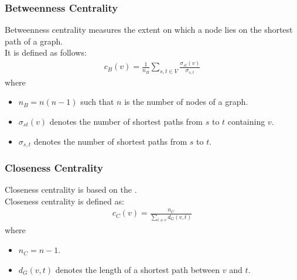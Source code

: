 \documentclass{beamer}
\begin{document}
\begin{frame}
     \frametitle{Betweenness Centrality}
     Betweenness centrality measures the extent on which a node lies on the shortest path of a graph.\\
     \vspace{5mm}
     It is defined as follows:
     \begin{align*}
      c_{B}(v)=\frac{1}{n_{B}} \sum_{s,t \in V} \frac{\sigma_{st}(v)}{\sigma_{s,t}}
     \end{align*}
     where 
     \begin{itemize}
     \item $n_B = n(n-1)$ such that $n$ is the number of nodes of a graph.
     \item $\sigma_{st}(v)$ denotes the number of shortest paths from $s$ to $t$ containing $v$.
     \item $\sigma_{s,t}$ denotes the number of shortest paths from $s$ to $t$.
     \end{itemize}
\end{frame}


\begin{frame}
     \frametitle{Closeness Centrality}
     Closeness centrality is based on the .\\
     \vspace{5mm}
     Closeness centrality is defined as:
     \begin{align*}
     c_{C}(v)=\frac{n_{C}}{\sum\limits_{t\neq v} d_{G}(v,t)}
     \end{align*}
     where
     \begin{itemize}
     \item $n_C = n-1$.
     \item $d_{G}(v,t)$ denotes the length of a shortest path between $v$ and $t$.
     \end{itemize}
\end{frame}


\end{document}
